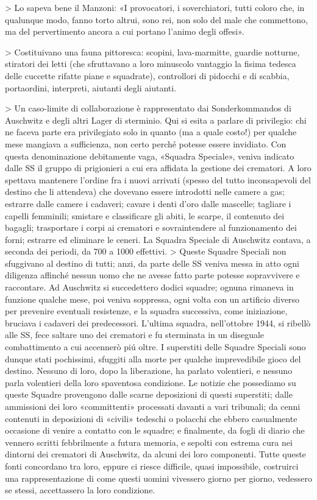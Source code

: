 > Lo sapeva bene il Manzoni: «I provocatori, i soverchiatori, tutti coloro che, in qualunque modo, fanno torto altrui, sono rei, non solo del male che commettono, ma del pervertimento ancora a cui portano l’animo degli offesi».

> Costituivano una fauna pittoresca: scopini, lava-marmitte, guardie notturne, stiratori dei letti (che sfruttavano a loro minuscolo vantaggio la fisima tedesca delle cuccette rifatte piane e squadrate), controllori di pidocchi e di scabbia, portaordini, interpreti, aiutanti degli aiutanti.

> Un caso-limite di collaborazione è rappresentato dai Sonderkommandos di Auschwitz e degli altri Lager di sterminio. Qui si esita a parlare di privilegio: chi ne faceva parte era privilegiato solo in quanto (ma a quale costo!) per qualche mese mangiava a sufficienza, non certo perché potesse essere invidiato. Con questa denominazione debitamente vaga, «Squadra Speciale», veniva indicato dalle SS il gruppo di prigionieri a cui era affidata la gestione dei crematori. A loro spettava mantenere l’ordine fra i nuovi arrivati (spesso del tutto inconsapevoli del destino che li attendeva) che dovevano essere introdotti nelle camere a gas; estrarre dalle camere i cadaveri; cavare i denti d’oro dalle mascelle; tagliare i capelli femminili; smistare e classificare gli abiti, le scarpe, il contenuto dei bagagli; trasportare i corpi ai crematori e sovraintendere al funzionamento dei forni; estrarre ed eliminare le ceneri. La Squadra Speciale di Auschwitz contava, a seconda dei periodi, da 700 a 1000 effettivi.
> Queste Squadre Speciali non sfuggivano al destino di tutti; anzi, da parte delle SS veniva messa in atto ogni diligenza affinché nessun uomo che ne avesse fatto parte potesse sopravvivere e raccontare. Ad Auschwitz si succedettero dodici squadre; ognuna rimaneva in funzione qualche mese, poi veniva soppressa, ogni volta con un artificio diverso per prevenire eventuali resistenze, e la squadra successiva, come iniziazione, bruciava i cadaveri dei predecessori. L’ultima squadra, nell’ottobre 1944, si ribellò alle SS, fece saltare uno dei crematori e fu sterminata in un diseguale combattimento a cui accennerò piú oltre. I superstiti delle Squadre Speciali sono dunque stati pochissimi, sfuggiti alla morte per qualche imprevedibile gioco del destino. Nessuno di loro, dopo la liberazione, ha parlato volentieri, e nessuno parla volentieri della loro spaventosa condizione. Le notizie che possediamo su queste Squadre provengono dalle scarne deposizioni di questi superstiti; dalle ammissioni dei loro «committenti» processati davanti a vari tribunali; da cenni contenuti in deposizioni di «civili» tedeschi o polacchi che ebbero casualmente occasione di venire a contatto con le squadre; e finalmente, da fogli di diario che vennero scritti febbrilmente a futura memoria, e sepolti con estrema cura nei dintorni dei crematori di Auschwitz, da alcuni dei loro componenti. Tutte queste fonti concordano tra loro, eppure ci riesce difficile, quasi impossibile, costruirci una rappresentazione di come questi uomini vivessero giorno per giorno, vedessero se stessi, accettassero la loro condizione.

